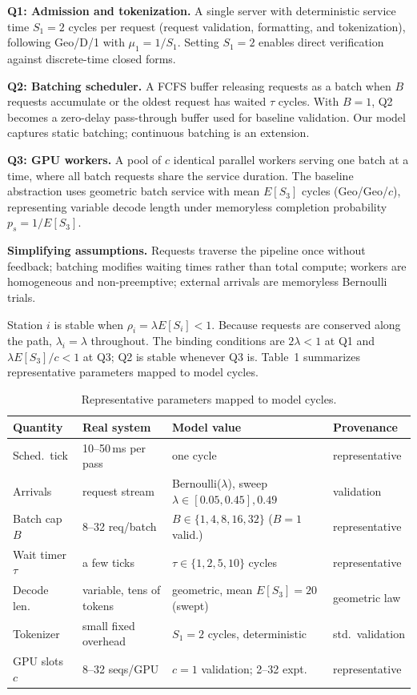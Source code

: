 \documentclass[conference]{IEEEtran}
\begin{document}
\textbf{Q1: Admission and tokenization.} A single server with deterministic service time $S_1 = 2$ cycles per request (request validation, formatting, and tokenization), following Geo/D/1 with $\mu_1 = 1/S_1$. Setting $S_1 = 2$ enables direct verification against discrete-time closed forms.

\textbf{Q2: Batching scheduler.} A FCFS buffer releasing requests as a batch when $B$ requests accumulate or the oldest request has waited $\tau$ cycles. With $B = 1$, Q2 becomes a zero-delay pass-through buffer used for baseline validation. Our model captures static batching; continuous batching is an extension.

\textbf{Q3: GPU workers.} A pool of $c$ identical parallel workers serving one batch at a time, where all batch requests share the service duration. The baseline abstraction uses geometric batch service with mean $E[S_3]$ cycles (Geo/Geo/$c$), representing variable decode length under memoryless completion probability $p_s = 1/E[S_3]$.

\textbf{Simplifying assumptions.} Requests traverse the pipeline once without feedback; batching modifies waiting times rather than total compute; workers are homogeneous and non-preemptive; external arrivals are memoryless Bernoulli trials.

Station $i$ is stable when $\rho_i = \lambda E[S_i] < 1$. Because requests are conserved along the path, $\lambda_i = \lambda$ throughout. The binding conditions are $2\lambda < 1$ at Q1 and $\lambda E[S_3]/c < 1$ at Q3; Q2 is stable whenever Q3 is. Table~1 summarizes representative parameters mapped to model cycles.

\begin{table}[!t]
\centering\scriptsize
\caption{Representative parameters mapped to model cycles.}
\setlength{\tabcolsep}{2.5pt}
\begin{tabular}{@{}p{1.25cm}p{1.85cm}p{2.65cm}p{1.45cm}@{}}
\toprule
Quantity & Real system & Model value & Provenance \\
\midrule
Sched.\ tick & 10--50\,ms per pass & one cycle & representative \\
Arrivals & request stream & Bernoulli($\lambda$), sweep $\lambda \in [0.05, 0.45], 0.49$ & validation \\
Batch cap $B$ & 8--32 req/batch & $B \in \{1,4,8,16,32\}$ ($B=1$ valid.) & representative \\
Wait timer $\tau$ & a few ticks & $\tau \in \{1,2,5,10\}$ cycles & representative \\
Decode len.\ & variable, tens of tokens & geometric, mean $E[S_3]=20$ (swept) & geometric law \\
Tokenizer & small fixed overhead & $S_1 = 2$ cycles, deterministic & std.\ validation \\
GPU slots $c$ & 8--32 seqs/GPU & $c=1$ validation; 2--32 expt.\ & representative \\
\bottomrule
\end{tabular}
\end{table}
\end{document}
